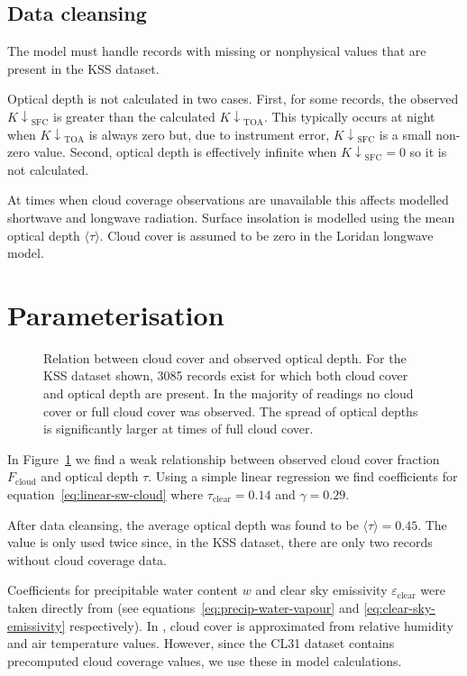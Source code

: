 \documentclass[a4paper,titlepage, twoside]{report}
\newcommand\Kdownsfc{{K\!\!\downarrow}_\mathrm{SFC}}
\newcommand\Kdowntoa{{K\!\!\downarrow}_\mathrm{TOA}}
\begin{document}
\subsection{Data cleansing}
The model must handle records with missing or nonphysical values that are present in the KSS dataset.  

Optical depth is not calculated in two cases.  First, for some records, the observed $\Kdownsfc$ is greater than the calculated $\Kdowntoa$.  This typically occurs at night when $\Kdowntoa$ is always zero but, due to instrument error, $\Kdownsfc$ is a small non-zero value.  Second, optical depth is effectively infinite when $\Kdownsfc = 0$ so it is not calculated.

At times when cloud coverage observations are unavailable this affects modelled shortwave and longwave radiation.  Surface insolation is modelled using the mean optical depth $\langle \tau \rangle$.  Cloud cover is assumed to be zero in the Loridan longwave model.

\section{Parameterisation}
\label{sec:parameterisation}

\begin{figure}
\centering

\caption{Relation between cloud cover and observed optical depth.  For the KSS dataset shown, 3085 records exist for which both cloud cover and optical depth are present.  In the majority of readings no cloud cover or full cloud cover was observed.  The spread of optical depths is significantly larger at times of full cloud cover.}
\label{fig:cloud-tau-fit}
\end{figure}

In Figure~\ref{fig:cloud-tau-fit} we find a weak relationship between observed cloud cover fraction $F_\mathrm{cloud}$ and optical depth $\tau$.  Using a simple linear regression we find coefficients for equation~\ref{eq:linear-sw-cloud} where $\tau_\mathrm{clear} = 0.14$ and $\gamma =  0.29$.

After data cleansing, the average optical depth was found to be $\langle \tau \rangle = 0.45$.  The value is only used twice since, in the KSS dataset, there are only two records without cloud coverage data.

Coefficients for precipitable water content $w$ and clear sky emissivity $\varepsilon_\mathrm{clear}$ were taken directly from \cite{loridan} (see equations~\ref{eq:precip-water-vapour} and \ref{eq:clear-sky-emissivity} respectively).  In \cite{loridan}, cloud cover is approximated from relative humidity and air temperature values.  However, since the CL31 dataset contains precomputed cloud coverage values, we use these in model calculations.
\end{document}

